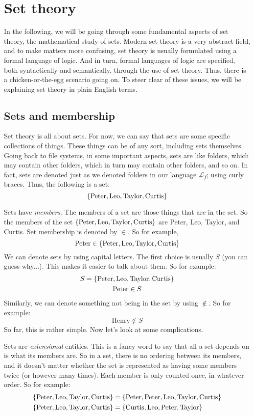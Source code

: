 \chapter{Set theory}

In the following, we will be going through some fundamental aspects of set theory, the mathematical study of sets. Modern set theory is a very abstract field, and to make matters more confusing, set theory is usually formulated using a formal language of logic. And in turn, formal languages of logic are specified, both syntactically and semantically, through the use of set theory. Thus, there is a chicken-or-the-egg scenario going on. To steer clear of these issues, we will be explaining set theory in plain English terms. 

\section{Sets and membership}

Set theory is all about sets. For now, we can say that sets are some specific collections of things. These things can be of any sort, including sets themselves. Going back to file systems, in some important aspects, sets are like folders, which may contain other folders, which in turn may contain other folders, and so on. In fact, sets are denoted just as we denoted folders in our language $\mathcal{L}_f$; using curly braces. Thus, the following is a set:
\[
\{\text{Peter}, \text{Leo}, \text{Taylor}, \text{Curtis}\}
\]

Sets have \textit{members}. The members of a set are those things that are in the set. So the members of the set $\{\text{Peter}, \text{Leo}, \text{Taylor}, \text{Curtis}\}$ are Peter, Leo, Taylor, and Curtis. Set membership is denoted by $\in$. So for example, 
\[
\text{Peter} \in \{\text{Peter}, \text{Leo}, \text{Taylor}, \text{Curtis}\}
\]
We can denote sets by using capital letters. The first choice is usually $S$ (you can guess why...). This makes it easier to talk about them. So for example:
\begin{gather*}
	S=\{\text{Peter}, \text{Leo}, \text{Taylor}, \text{Curtis}\}\\
	\text{Peter} \in S
\end{gather*}
Similarly, we can denote something not being in the set by using $\notin$. So for example:
\[
\text{Henry} \notin S
\]
So far, this is rather simple. Now let's look at some complications. 

Sets are \textit{extensional} entities. This is a fancy word to say that all a set depends on is what its members are. So in a set, there is no ordering between its members, and it doesn't matter whether the set is represented as having some members twice (or however many times). Each member is only counted once, in whatever order. So for example:
\begin{align*}
\{\text{Peter}, \text{Leo}, \text{Taylor}, \text{Curtis}\}&=\{\text{Peter}, \text{Peter}, \text{Leo}, \text{Taylor}, \text{Curtis}\}\\
\{\text{Peter}, \text{Leo}, \text{Taylor}, \text{Curtis}\}&= \{\text{Curtis}, \text{Leo}, \text{Peter}, \text{Taylor}\}
\end{align*}

